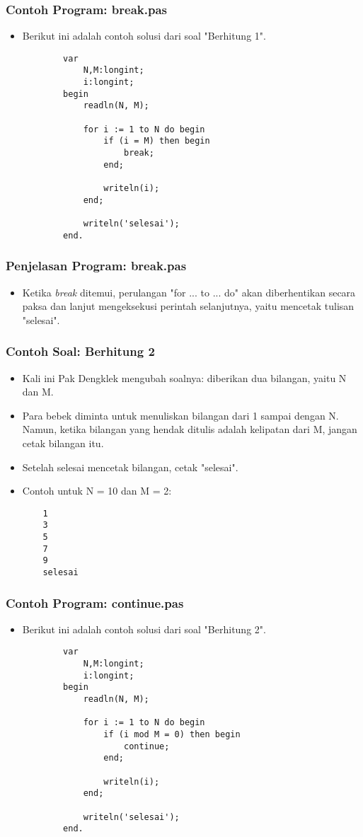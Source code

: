 \documentclass{beamer}
\begin{document}
\begin{frame}[fragile]
\frametitle{Contoh Program: break.pas}
\begin{itemize}
	\item Berikut ini adalah contoh solusi dari soal "Berhitung 1".
	\begin{lstlisting}
		var
		    N,M:longint;
		    i:longint;
		begin
		    readln(N, M);
		
		    for i := 1 to N do begin
		        if (i = M) then begin
		            break;
		        end;
		
		        writeln(i);
		    end;
		    
		    writeln('selesai');
		end.
	\end{lstlisting}
\end{itemize}
\end{frame}

\begin{frame}
\frametitle{Penjelasan Program: break.pas}
\begin{itemize}
	\item Ketika \textit{break} ditemui, perulangan "for ... to ... do" akan diberhentikan secara paksa dan lanjut mengeksekusi perintah selanjutnya, yaitu mencetak tulisan "selesai".
\end{itemize}
\end{frame}

\begin{frame}[fragile]
\frametitle{Contoh Soal: Berhitung 2}
\begin{itemize}
	\item Kali ini Pak Dengklek mengubah soalnya: diberikan dua bilangan, yaitu N dan M.
	\item Para bebek diminta untuk menuliskan bilangan dari 1 sampai dengan N. Namun, ketika bilangan yang hendak ditulis adalah \alert{kelipatan} dari M, jangan cetak bilangan itu.
	\item Setelah selesai mencetak bilangan, cetak "selesai".
	\item Contoh untuk N = 10 dan M = 2:
	\begin{lstlisting}
	1
	3
	5
	7
	9
	selesai
	\end{lstlisting}
\end{itemize}
\end{frame}

\begin{frame}[fragile]
\frametitle{Contoh Program: continue.pas}
\begin{itemize}
	\item Berikut ini adalah contoh solusi dari soal "Berhitung 2".
	\begin{lstlisting}
		var
		    N,M:longint;
		    i:longint;
		begin
		    readln(N, M);
		
		    for i := 1 to N do begin
		        if (i mod M = 0) then begin
		            continue;
		        end;
		
		        writeln(i);
		    end;
		    
		    writeln('selesai');
		end.
	\end{lstlisting}
\end{itemize}
\end{frame}
\end{document}
